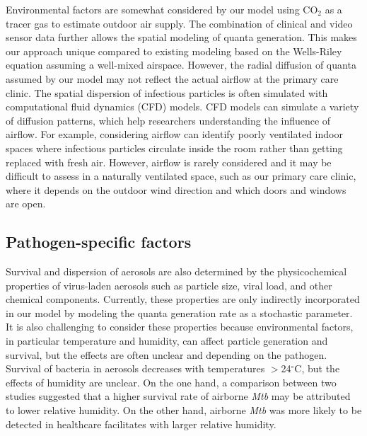 \documentclass[fleqn,11pt]{wlscirep_supp}
\begin{document}
Environmental factors are somewhat considered by our model using CO$_2$ as a tracer gas to estimate outdoor air supply. The combination of clinical and video sensor data further allows the spatial modeling of quanta generation. This makes our approach unique compared to existing modeling based on the Wells-Riley equation assuming a well-mixed airspace\cite{Riley1978AJE,Rudnick2003IndoorAir}. However, the radial diffusion of quanta assumed by our model may not reflect the actual airflow at the primary care clinic. The spatial dispersion of infectious particles is often simulated with computational fluid dynamics (CFD) models\cite{Vuorinen2020SafSci,Jung2021InfectChemo,Li2021BuildEnv}. CFD models can simulate a variety of diffusion patterns, which help researchers understanding the influence of airflow. For example, considering airflow can identify poorly ventilated indoor spaces where infectious particles circulate inside the room rather than getting replaced with fresh air\cite{Li2021BuildEnv}. However, airflow is rarely considered and it may be difficult to assess in a naturally ventilated space, such as our primary care clinic, where it depends on the outdoor wind direction and which doors and windows are open. 

\subsection{Pathogen-specific factors}

Survival and dispersion of aerosols are also determined by the physicochemical properties of virus-laden aerosols such as particle size, viral load, and other chemical components\cite{Wang2021Science}. Currently, these properties are only indirectly incorporated in our model by modeling the quanta generation rate as a stochastic parameter. It is also challenging to consider these properties because environmental factors, in particular temperature and humidity, can affect particle generation and survival, but the effects are often unclear and depending on the pathogen\cite{Songer1967,Chan2011AdvVir,Fernstrom2013JoP,Cox1995Book,Fernstrom2013JoP,Tang2009Interface}. Survival of bacteria in aerosols decreases with temperatures $>$24$^{\circ}$C, but the effects of humidity are unclear\cite{Tang2009Interface}. On the one hand, a comparison between two studies suggested that a higher survival rate of airborne \emph{Mtb} may be attributed to lower relative humidity\cite{Loudon1969AMRRD,Lever2000LettersAppliedMicrobio}. On the other hand, airborne \emph{Mtb} was more likely to be detected in healthcare facilitates with larger relative humidity\cite{Sornboot2019IJTLD,Matuka2021IJERP}.   
\end{document}
